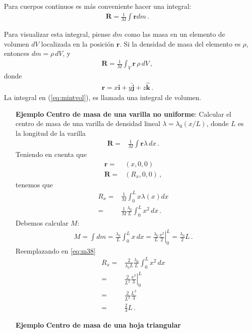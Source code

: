 Para cuerpos continuos es más conveniente hacer una integral:
\begin{align}
  \mathbf{R}=\frac{1}{M}\int \mathbf{r} dm\,.
\end{align}

Para visualizar esta integral, piense $dm$ como las masa en un elemento de volumen $dV$ localizada en la posición $\mathbf{r}$. Si la densidad de masa del elemento es $\rho$, entonces $dm=\rho\,dV$, y
\begin{align}
\label{eq:mintvol}
  \mathbf{R}=\frac{1}{M}\int_V \mathbf{r}\,\rho\,dV\,, 
\end{align}
donde
\begin{align}
  \mathbf{r}=x\hat{\mathbf{i}}+y\hat{\mathbf{j}}+z\hat{\mathbf{k}}\,.
\end{align}
La integral en (\ref{eq:mintvol}), es llamada una integral de volumen.

\begin{itemize}
\item[\textbf{Ejemplo}] \textbf{Centro de masa de una varilla no uniforme}: Calcular el centro de masa de una varilla de densidad lineal $\lambda=\lambda_0(x/L)$, donde $L$ es la longitud de la varilla
  \begin{align}
    \mathbf{R}=&\frac{1}{M}\int \mathbf{r}\lambda\,dx\,.
  \end{align}
Teniendo en cuenta que
\begin{align}
  \mathbf{r}=&(x,0,0)\nonumber\\
  \mathbf{R}=&(R_x,0,0)\,,
\end{align}
tenemos que
\begin{align}
  \label{eq:m38}
  R_x=&\frac{1}{M}\int_0^L x\lambda(x)dx\nonumber\\
  =&\frac{1}{M}\frac{\lambda_0}{L}\int_0^L x^2\,dx\,.
\end{align}
Debemos calcular $M$:
\begin{align}
  M=\int dm=\frac{\lambda_0}{L}\int_0^L x\,dx=\frac{\lambda_0}{L}
  \left.\frac{x^2}{2}  \right|_0^L=\frac{\lambda_0}{2}L\,.
\end{align}
Reemplazando en \eqref{eq:m38}
\begin{align}
  R_x=&\frac{2}{\lambda_0L}\frac{\lambda_0}{L}\int_0^L x^2\,dx\nonumber\\
  =&\frac{2}{L^2}\left.\frac{x^3}{3}  \right|_0^L\nonumber\\
  =&\frac{2}{L^2}\frac{L^3}{3}\nonumber\\
  =&\frac{2}{3}L\,.
\end{align}

\item[\textbf{Ejemplo}] \textbf{Centro de masa de una hoja triangular} 
\end{itemize}

